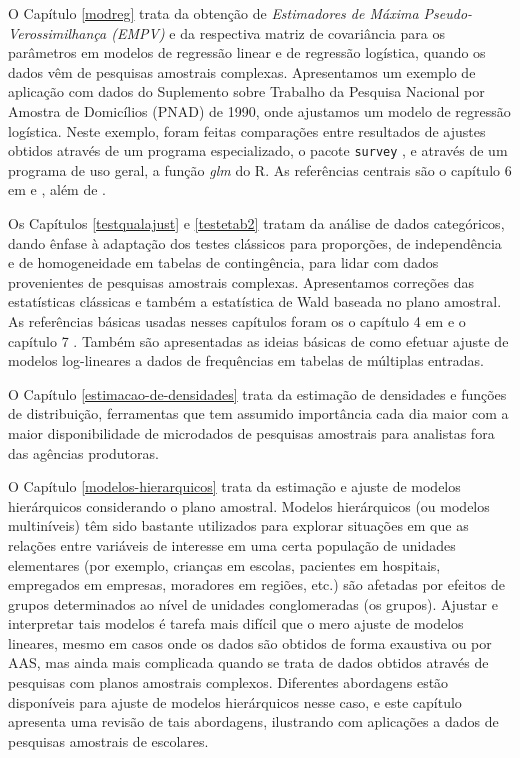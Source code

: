\documentclass[
]{book}
\begin{document}
O Capítulo \ref{modreg} trata da obtenção de \emph{Estimadores de
Máxima Pseudo-Verossimilhança (EMPV)} e da respectiva matriz de covariância
para os parâmetros em modelos de regressão linear e de regressão logística, quando
os dados vêm de pesquisas amostrais complexas. Apresentamos um exemplo de aplicação
com dados do Suplemento sobre Trabalho da Pesquisa Nacional por
Amostra de Domicílios (PNAD) de 1990, onde ajustamos um modelo de
regressão logística. Neste exemplo, foram feitas comparações entre
resultados de ajustes obtidos através de um programa especializado, o pacote \texttt{survey}
\citep{R-survey}, e através de um programa de uso geral, a função \emph{glm} do R. As referências
centrais são o capítulo 6 em \citep{Silva} e \citep{binder83}, além de \citep{Pessoa}.

Os Capítulos \ref{testqualajust} e \ref{testetab2} tratam da análise de dados
categóricos, dando ênfase à adaptação dos testes clássicos
para proporções, de independência e de homogeneidade em tabelas
de contingência, para lidar com dados provenientes de pesquisas amostrais
complexas. Apresentamos correções das estatísticas clássicas
e também a estatística de Wald baseada no plano amostral. As referências
básicas usadas nesses capítulos foram os o capítulo 4 em \citep{SHS89} e
o capítulo 7 \citep{lethonen}. Também são apresentadas as ideias básicas de como
efetuar ajuste de modelos log-lineares a dados de frequências em tabelas de
múltiplas entradas.

O Capítulo \ref{estimacao-de-densidades} trata da estimação de densidades e
funções de distribuição, ferramentas que tem assumido importância cada dia maior
com a maior disponibilidade de microdados de pesquisas amostrais para analistas
fora das agências produtoras.

O Capítulo \ref{modelos-hierarquicos} trata da estimação e ajuste de modelos hierárquicos
considerando o plano amostral. Modelos hierárquicos (ou modelos multiníveis) têm sido
bastante utilizados para explorar situações em que as relações entre variáveis de
interesse em uma certa população de unidades elementares (por exemplo, crianças em escolas,
pacientes em hospitais, empregados em empresas, moradores em regiões, etc.) são afetadas
por efeitos de grupos determinados ao nível de unidades conglomeradas (os grupos). Ajustar
e interpretar tais modelos é tarefa mais difícil que o mero ajuste de modelos lineares,
mesmo em casos onde os dados são obtidos de forma exaustiva ou por AAS, mas ainda mais complicada
quando se trata de dados obtidos através de pesquisas com planos amostrais complexos.
Diferentes abordagens estão disponíveis para ajuste de modelos hierárquicos nesse caso, e este
capítulo apresenta uma revisão de tais abordagens, ilustrando com aplicações a dados
de pesquisas amostrais de escolares.
\end{document}

